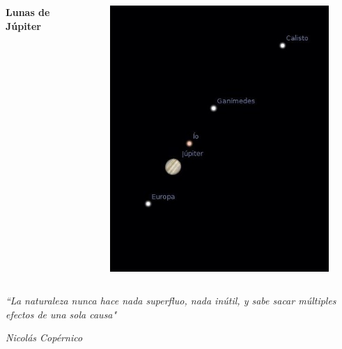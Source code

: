 \documentclass{beamer}
\begin{document}
\begin{frame}
 \begin{columns}
  \begin{center}
  \Huge
  \textbf{Lunas de Júpiter}
  \end{center}
   \begin{figure}
    \centering
    \includegraphics[scale=0.5]{Imagenes/Lunas_jupiter}
  \end{figure}
 \end{columns}
\end{frame}


\begin{frame}
\begin{center}
\Huge 
\textit{``La naturaleza nunca hace nada superfluo, nada inútil, y sabe sacar múltiples efectos de una sola causa"}
\end{center}
\begin{flushright}
\small
\textit{Nicolás Copérnico}
\end{flushright}
\end{frame}


\end{document}
